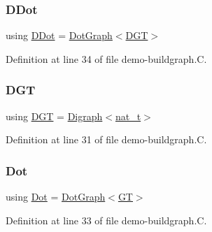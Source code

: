 \subsubsection{\texorpdfstring{D\+Dot}{DDot}}
{\footnotesize\ttfamily using \hyperlink{demo-buildgraph_8_c_a0ffdd103a7285712ccbd9548ff5544e7}{D\+Dot} =  \hyperlink{class_designar_1_1_dot_graph}{Dot\+Graph}$<$\hyperlink{demo-buildgraph_8_c_ae73e956c2a8cf0a58255aa6b659985e0}{D\+GT}$>$}



Definition at line 34 of file demo-\/buildgraph.\+C.

\mbox{\label{demo-buildgraph_8_c_ae73e956c2a8cf0a58255aa6b659985e0}} 
\subsubsection{\texorpdfstring{D\+GT}{DGT}}
{\footnotesize\ttfamily using \hyperlink{demo-buildgraph_8_c_ae73e956c2a8cf0a58255aa6b659985e0}{D\+GT} =  \hyperlink{class_designar_1_1_digraph}{Digraph}$<$\hyperlink{namespace_designar_aa72662848b9f4815e7bf31a7cf3e33d1}{nat\+\_\+t}$>$}



Definition at line 31 of file demo-\/buildgraph.\+C.

\mbox{\label{demo-buildgraph_8_c_a70657b0b48a4d69ef850be3c5517ecc2}} 
\subsubsection{\texorpdfstring{Dot}{Dot}}
{\footnotesize\ttfamily using \hyperlink{demo-buildgraph_8_c_a70657b0b48a4d69ef850be3c5517ecc2}{Dot} =  \hyperlink{class_designar_1_1_dot_graph}{Dot\+Graph}$<$\hyperlink{demo-buildgraph_8_c_a3001c40d2c31ca87ed96cd7d1334a55e}{GT}$>$}



Definition at line 33 of file demo-\/buildgraph.\+C.

\mbox{\label{demo-buildgraph_8_c_a3001c40d2c31ca87ed96cd7d1334a55e}} 
